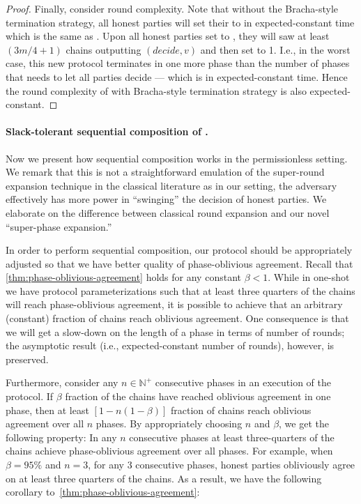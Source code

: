 \begin{proof}
    Finally, consider round complexity.
    Note that without the Bracha-style termination strategy, all honest parties will set their \decide to \true in expected-constant time which is the same as \chainKingConsensus.
    Upon all honest parties set \decide to \true, they will saw at least $(3m / 4 + 1)$ chains outputting $(decide, v)$ and then set \exit to 1.
    I.e., in the worst case, this new protocol terminates in one more phase than the number of phases that \chainKingConsensus needs to let all parties decide --- which is in expected-constant time.
    Hence the round complexity of \chainKingConsensus with Bracha-style termination strategy is also expected-constant.
\end{proof}

\paragraph{Slack-tolerant sequential composition of \chainKingConsensus.}
%
Now we present how sequential composition works in the permissionless setting.
%
We remark that this is not a straightforward emulation of the super-round expansion technique in the classical literature as in our setting, the adversary effectively has more power in ``swinging'' the decision of honest parties.
%
We elaborate on the difference between classical round expansion and our novel ``super-phase expansion.''

In order to perform sequential composition, our protocol should be appropriately adjusted so that we have better quality of phase-oblivious agreement.
%
Recall that \cref{thm:phase-oblivious-agreement} holds for any constant $\beta < 1$.
%
While in one-shot \chainKingConsensus we have protocol parameterizations such that at least three quarters of the chains will reach phase-oblivious agreement, it is possible to achieve that an arbitrary (constant) fraction of chains reach oblivious agreement.
%
One consequence is that we will get a slow-down on the length of a phase in terms of number of rounds; the asymptotic result (i.e., expected-constant number of rounds), however, is preserved.

Furthermore, consider any $n \in \mathbb{N}^+$ consecutive phases in an execution of the protocol.
%
If $\beta$ fraction of the chains have reached oblivious agreement in one phase, then at least $[1 - n(1 - \beta)]$ fraction of chains reach oblivious agreement over all $n$ phases.
%
By appropriately choosing $n$ and $\beta$, we get the following property:
%
In any $n$ consecutive phases at least three-quarters of the chains achieve phase-oblivious agreement over all phases.
%
For example, when $\beta = 95\%$ and $n = 3$, for any 3 consecutive phases, honest parties obliviously agree on at least three quarters of the chains.
%
As a result, we have the following corollary to~\cref{thm:phase-oblivious-agreement}:

